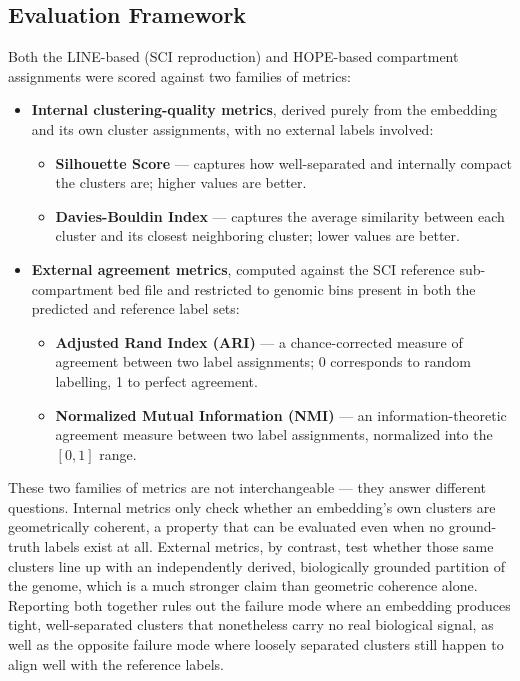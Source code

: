 \documentclass[12pt]{article}
\begin{document}
\subsection{Evaluation Framework}
Both the LINE-based (SCI reproduction) and HOPE-based compartment assignments were scored
against two families of metrics:

\begin{itemize}
    \item \textbf{Internal clustering-quality metrics}, derived purely from the embedding and its
    own cluster assignments, with no external labels involved:
    \begin{itemize}
        \item \textbf{Silhouette Score} — captures how well-separated and internally compact the
        clusters are; higher values are better.
        \item \textbf{Davies-Bouldin Index} — captures the average similarity between each
        cluster and its closest neighboring cluster; lower values are better.
    \end{itemize}
    \item \textbf{External agreement metrics}, computed against the SCI reference sub-compartment
    bed file and restricted to genomic bins present in both the predicted and reference label
    sets:
    \begin{itemize}
        \item \textbf{Adjusted Rand Index (ARI)} — a chance-corrected measure of agreement
        between two label assignments; 0 corresponds to random labelling, 1 to perfect agreement.
        \item \textbf{Normalized Mutual Information (NMI)} — an information-theoretic agreement
        measure between two label assignments, normalized into the $[0,1]$ range.
    \end{itemize}
\end{itemize}

These two families of metrics are not interchangeable — they answer different questions.
Internal metrics only check whether an embedding's own clusters are geometrically coherent, a
property that can be evaluated even when no ground-truth labels exist at all. External metrics,
by contrast, test whether those same clusters line up with an independently derived, biologically
grounded partition of the genome, which is a much stronger claim than geometric coherence alone.
Reporting both together rules out the failure mode where an embedding produces tight,
well-separated clusters that nonetheless carry no real biological signal, as well as the opposite
failure mode where loosely separated clusters still happen to align well with the reference labels.
\end{document}
